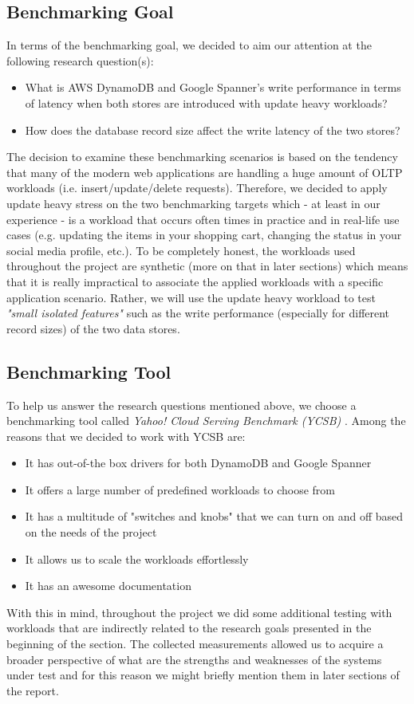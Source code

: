 \documentclass[letterpaper, 10 pt, conference]{ieeeconf}  %
\begin{document}
\subsection{Benchmarking Goal}
In terms of the benchmarking goal, we decided to aim our attention at the following research question(s): 
\begin{itemize}
    \item What is AWS DynamoDB and Google Spanner’s write performance in terms of latency when both stores are introduced with update heavy workloads? 
    \item How does the database record size affect the write latency of the two stores?  
\end{itemize}
The decision to examine these benchmarking scenarios is based on the tendency that many of the modern web applications are handling a huge amount of OLTP workloads (i.e. insert/update/delete requests). Therefore, we decided to apply update heavy stress on the two benchmarking targets which - at least in our experience - is a workload that occurs often times in practice and in real-life use cases (e.g. updating the items in your shopping cart, changing the status in your social media profile, etc.). To be completely honest, the workloads used throughout the project are synthetic (more on that in later sections) which means that it is really impractical to associate the applied workloads with a specific application scenario. Rather, we will use the update heavy workload to test \textit {"small isolated features"} \cite{StefanTaiBook} such as the write performance (especially for different record sizes) of the two data stores.


\subsection{Benchmarking Tool}
To help us answer the research questions mentioned above, we choose a benchmarking tool called \textit{Yahoo! Cloud Serving Benchmark (YCSB)} \cite{Cooper:2010:BCS:1807128.1807152}. Among the reasons that we decided to work with YCSB are:
\begin{itemize}
    \item It has out-of-the box drivers for both DynamoDB and Google Spanner  
    \item It offers a large number of predefined workloads to choose from
    \item It has a multitude of "switches and knobs" that we can turn on and off based on the needs of the project
    \item It allows us to scale the workloads effortlessly
    \item It has an awesome documentation 
\end{itemize}
With this in mind, throughout the project we did some additional testing with workloads that are indirectly related to the research goals presented in the beginning of the section. The collected measurements allowed us to acquire a broader perspective of what are the strengths and weaknesses of the systems under test and for this reason we might briefly mention them in later sections of the report.
\end{document}
